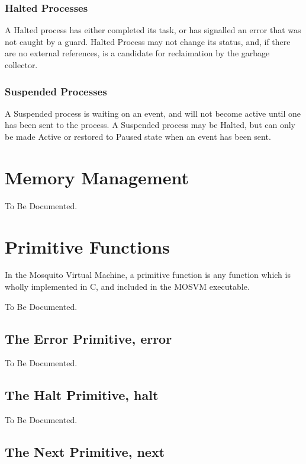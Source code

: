 \documentclass[notitlepage,oneside]{book}
\begin{document}
\subsection{Halted Processes}

A Halted process has either completed its task, or has signalled an error that was not caught by a guard.   Halted Process may not change its status, and, if there are no external references, is a candidate for reclaimation by the garbage collector.

\subsection{Suspended Processes}

A Suspended process is waiting on an event, and will not become active until one has been sent to the process.  A Suspended process may be Halted, but can only be made Active or restored to Paused state when an event has been sent.

\chapter{Memory Management}
\label{memory}

To Be Documented.

\chapter{Primitive Functions}
\label{primitives}

In the Mosquito Virtual Machine, a primitive function is any function which is wholly implemented in C, and included in the MOSVM executable.

To Be Documented.

\section{The Error Primitive, error}
\label{p-error}

To Be Documented.

\section{The Halt Primitive, halt}
\label{p-halt}

To Be Documented.

\section{The Next Primitive, next}
\label{p-next}
\end{document}
